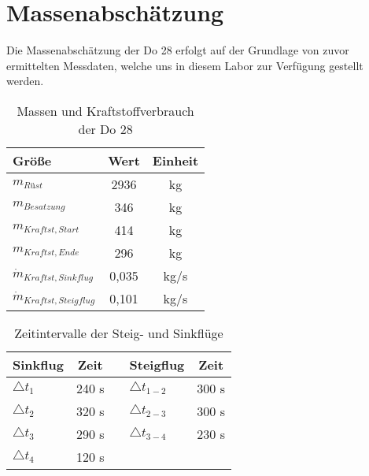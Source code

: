 \chapter{Massenabschätzung}
\label{chapter:masse}
Die Massenabschätzung der Do 28 erfolgt auf der Grundlage von zuvor ermittelten Messdaten, welche uns in diesem Labor zur Verfügung gestellt werden. \\

\begin{table}[h]
	\centering
	\begin{tabular}{|l|c|c|}
		\hline
	\textbf{Größe}		 & \textbf{Wert}& \textbf{Einheit} \\ \hline
	$m_{Rüst}$  		 & 2936			& {kg}        \\ \hline
	$m_{Besatzung}$ 	 & 346			& {kg}		  \\ \hline
	$m_{Kraftst,Start}$	 & 414			& {kg}		  \\ \hline
	$m_{Kraftst,Ende}$	 & 296			& {kg}		  \\ \hline
	$\dot{m}_{Kraftst,Sinkflug}$    & 0,035			& {kg/s}		  \\ \hline
	$\dot{m}_{Kraftst,Steigflug}$ 	 & 0,101			& {kg/s}	  \\ \hline
		


\end{tabular}
	\caption{Massen und Kraftstoffverbrauch der Do 28}
\end{table}


\begin{table}[h]
	\centering
	\begin{tabular}{|l|c|c|l|c|}
		\hline
		\textbf{Sinkflug}		 & \textbf{Zeit}& \textbf{} & \textbf{Steigflug} & \textbf{Zeit} \\ \hline
		$\triangle t_1$  & 240 s & & $\triangle t_{1-2}$ & 300 s         \\ \hline
		$\triangle t_2$  & 320 s & & $\triangle t_{2-3}$ & 300 s		  \\ \hline
		$\triangle t_3$	 & 290 s & & $\triangle t_{3-4}$ & 230 s	  \\ \hline
		$\triangle t_4$	 & 120 s & &	&	  \\ \hline
	
	  \hline
		
		
		
	\end{tabular}
	\caption{Zeitintervalle der Steig- und Sinkflüge}
\end{table} 
\vspace{0.3cm} 

